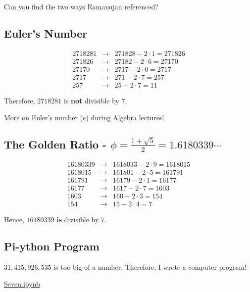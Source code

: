 Can you find the two ways Ramanujan referenced?  

\clearpage

\subsection*{Euler's Number}

\begin{eqnarray*}  
	2718281 &\to& 271828-2\cdot 1=271826 \\ 
	271826 &\to& 27182-2\cdot 6=27170 \\
	27170 &\to& 2717-2\cdot 0=2717 \\ 2717 &\to& 271-2\cdot 7=257 \\ 257 &\to& 25-2\cdot 7=11
\end{eqnarray*}

Therefore, $2718281$ is \textbf{not} divisible by $7$.

More on Euler's number ($e$) during Algebra lectures!  

\clearpage

\subsection*{The Golden Ratio - $\phi=\frac{1+\sqrt{5}}{2}=1.6180339\cdots$}

\begin{eqnarray*}
	16180339 &\to& 1618033-2\cdot 9=1618015 \\ 1618015 &\to& 161801-2\cdot 5=161791 \\ 161791 &\to& 16179-2\cdot 1=16177 \\ 16177 &\to& 1617-2\cdot 7=1603 \\ 1603 &\to& 160-2\cdot 3=154 \\ 154 &\to& 15-2\cdot 4=7
\end{eqnarray*}  

Hence, $16180339$ \textbf{is} divisible by $7$.

\clearpage

\subsection{Pi-ython Program}

$31,415,926,535$ is too big of a number.  Therefore, I wrote a computer program!

\begin{center} \Huge \href{https://github.com/musichead42/Teaching/blob/master/astar2016wmc/programs/Seven.ipynb}{Seven.ipynb} \end{center}
\normalsize

